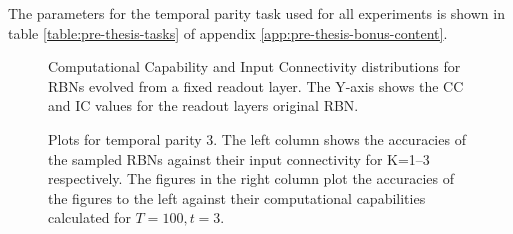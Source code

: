 The parameters for the temporal parity task used for all experiments is shown in table \ref{table:pre-thesis-tasks} of appendix \ref{app:pre-thesis-bonus-content}.

\begin{figure}[ht]
    \centering
    \caption[Computational capability and input connectivity for evolved RBNs]{
        Computational Capability and Input Connectivity distributions for RBNs evolved from a fixed readout layer.
        The Y-axis shows the CC and IC values for the readout layers original RBN.
    }
\end{figure}

\begin{figure}
    \centering


    \caption[Temporal parity 3: Accuracy and computational capability plots]{
        Plots for temporal parity 3.
        The left column shows the accuracies of the sampled RBNs against their input connectivity for K=1--3 respectively.
        The figures in the right column plot the accuracies of the figures to the left against their computational capabilities calculated for $T=100, t=3$.
    }
    \label{figure:results:temporal-parity-3}
\end{figure}

